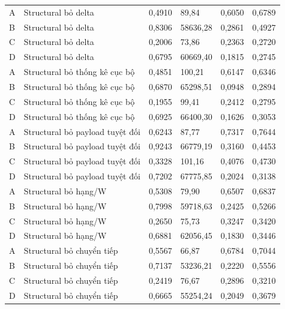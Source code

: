 \documentclass[12pt, a4paper, reqno, oneside]{book}
\begin{document}
{\begin{longtable}{P{1.1cm}P{4.9cm}P{1.6cm}P{2.2cm}P{1.6cm}P{1.6cm}}
A & Structural bỏ delta & 0,4910 & 89,84 & 0,6050 & 0,6789\\
B & Structural bỏ delta & 0,8306 & 58636,28 & 0,2861 & 0,4927\\
C & Structural bỏ delta & 0,2006 & 73,86 & 0,2363 & 0,2720\\
D & Structural bỏ delta & 0,6795 & 60669,40 & 0,1815 & 0,2745\\
A & Structural bỏ thống kê cục bộ & 0,4851 & 100,21 & 0,6147 & 0,6346\\
B & Structural bỏ thống kê cục bộ & 0,6870 & 65298,51 & 0,0948 & 0,2894\\
C & Structural bỏ thống kê cục bộ & 0,1955 & 99,41 & 0,2412 & 0,2795\\
D & Structural bỏ thống kê cục bộ & 0,6925 & 66400,30 & 0,1626 & 0,3053\\
A & Structural bỏ payload tuyệt đối & 0,6243 & 87,77 & 0,7317 & 0,7644\\
B & Structural bỏ payload tuyệt đối & 0,9243 & 66779,19 & 0,3160 & 0,4453\\
C & Structural bỏ payload tuyệt đối & 0,3328 & 101,16 & 0,4076 & 0,4730\\
D & Structural bỏ payload tuyệt đối & 0,7202 & 67775,85 & 0,2024 & 0,3138\\
A & Structural bỏ hạng/W & 0,5308 & 79,90 & 0,6507 & 0,6837\\
B & Structural bỏ hạng/W & 0,7998 & 59718,63 & 0,2425 & 0,5266\\
C & Structural bỏ hạng/W & 0,2650 & 75,73 & 0,3247 & 0,3420\\
D & Structural bỏ hạng/W & 0,6881 & 62056,45 & 0,1830 & 0,3446\\
A & Structural bỏ chuyển tiếp & 0,5567 & 66,87 & 0,6784 & 0,7044\\
B & Structural bỏ chuyển tiếp & 0,7137 & 53236,21 & 0,2220 & 0,5556\\
C & Structural bỏ chuyển tiếp & 0,2419 & 76,67 & 0,2896 & 0,3210\\
D & Structural bỏ chuyển tiếp & 0,6665 & 55254,24 & 0,2049 & 0,3679\\
\bottomrule\end{longtable}}
\end{document}
